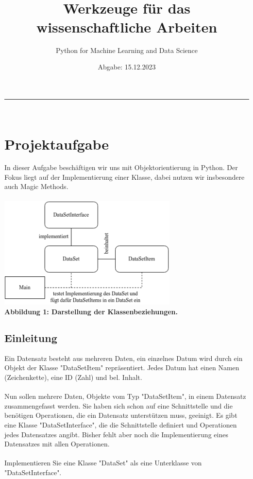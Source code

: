 \documentclass[]{article}
\begin{document}
\title{Werkzeuge für das wissenschaftliche Arbeiten}
\author{Python for Machine Learning and Data Science}
\date{Abgabe: 15.12.2023}
\maketitle
\hrule\hfill\\[0.2cm]
\tableofcontents
\section{Projektaufgabe}
In dieser Aufgabe beschäftigen wir uns mit Objektorientierung in Python.
Der Fokus liegt auf der Implementierung einer Klasse, dabei nutzen wir insbesondere auch Magic Methods.\\
\\
\includegraphics[width=9cm, height=5.66cm]{./../diagram/classes_files.png}\\
\scriptsize\bf Abbildung 1: \normalfont Darstellung der Klassenbeziehungen.\normalsize\\
\subsection{Einleitung}
Ein Datensatz besteht aus mehreren Daten, ein einzelnes Datum wird durch ein Objekt der Klasse "DataSetItem" repräsentiert.
Jedes Datum hat einen Namen (Zeichenkette), eine ID (Zahl) und bel. Inhalt.\\
\\
Nun sollen mehrere Daten, Objekte vom Typ "DataSetItem", in einem Datensatz zusammengefasst werden.
Sie haben sich schon auf eine Schnittstelle und die benötigen Operationen, die ein Datensatz unterstützen muss, geeinigt.
Es gibt eine Klasse "DataSetInterface", die die Schnittstelle definiert und Operationen jedes Datensatzes angibt.
Bisher fehlt aber noch die Implementierung eines Datensatzes mit allen Operationen.\\
\\
Implementieren Sie eine Klasse "DataSet" als eine Unterklasse von "DataSetInterface".
\end{document}

